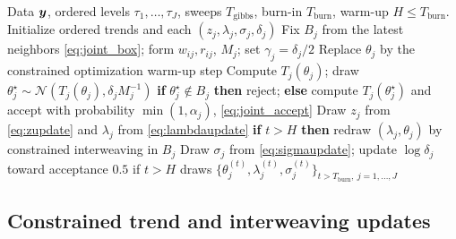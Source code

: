 \begin{algorithm}[!htbp]
\caption{Joint Bayesian-PMALA for ordered quantile levels}
\label{alg:joint_pmala}
\begin{algorithmic}[1]
\Require Data $\bm{y}$, ordered levels $\tau_1,\ldots,\tau_J$, sweeps $T_{\mathrm{gibbs}}$, burn-in $T_{\mathrm{burn}}$, warm-up $H\leq T_{\mathrm{burn}}$.
\State Initialize ordered trends and each $(z_j,\lambda_j,\sigma_j,\delta_j)$ 
        \State Fix $B_j$ from the latest neighbors \eqref{eq:joint_box}; form $w_{ij}, r_{ij}$, $M_j$; set $\gamma_j = \delta_j/2$
            \State Replace $\theta_j$ by the constrained optimization warm-up step
        \Else
            \State Compute $T_j(\theta_j)$; draw $\theta_j^\star \sim \mathcal N(T_j(\theta_j), \delta_jM_j^{-1})$ 
            \State \textbf{if} $\theta_j^\star\notin B_j$ \textbf{then} reject; \textbf{else} compute $T_j(\theta_j^\star)$ and accept with probability $\min(1,\alpha_j)$, \eqref{eq:joint_accept}
        \EndIf
        \State Draw $z_j$ from \eqref{eq:zupdate} and $\lambda_j$ from \eqref{eq:lambdaupdate}
        \State \textbf{if} $t>H$ \textbf{then} redraw $(\lambda_j,\theta_j)$ by constrained interweaving in $B_j$
        \State Draw $\sigma_j$ from \eqref{eq:sigmaupdate}; update $\log\delta_j$ toward acceptance $0.5$ if $t > H$
    \EndFor
\EndFor
\State \Return draws $\{\theta_j^{(t)}, \lambda_j^{(t)}, \sigma_j^{(t)}\}_{t > T_{\mathrm{burn}},\ j = 1,\ldots,J}$
\end{algorithmic}
\end{algorithm}

\subsection{Constrained trend and interweaving updates}
\label{subsec:joint_trend}

